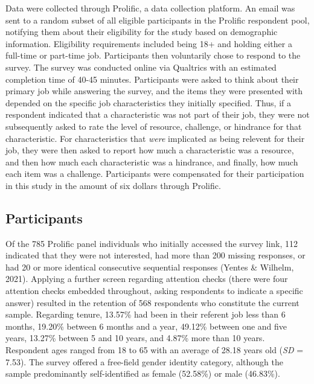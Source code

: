 \documentclass[
  man]{apa6}
\begin{document}
Data were collected through Prolific, a data collection platform. An email was sent to a random subset of all eligible participants in the Prolific respondent pool, notifying them about their eligibility for the study based on demographic information. Eligibility requirements included being 18+ and holding either a full-time or part-time job. Participants then voluntarily chose to respond to the survey. The survey was conducted online via Qualtrics with an estimated completion time of 40-45 minutes. Participants were asked to think about their primary job while answering the survey, and the items they were presented with depended on the specific job characteristics they initially specified. Thus, if a respondent indicated that a characteristic was not part of their job, they were not subsequently asked to rate the level of resource, challenge, or hindrance for that characteristic. For characteristics that \emph{were} implicated as being relevent for their job, they were then asked to report how much a characteristic was a resource, and then how much each characteristic was a hindrance, and finally, how much each item was a challenge. Participants were compensated for their participation in this study in the amount of six dollars through Prolific.

\hypertarget{participants}{%
\subsection{Participants}\label{participants}}

Of the 785 Prolific panel individuals who initially accessed the survey link, 112 indicated that they were not interested, had more than 200 missing responses, or had 20 or more identical consecutive sequential responses (Yentes \& Wilhelm, 2021). Applying a further screen regarding attention checks (there were four attention checks embedded throughout, asking respondents to indicate a specific answer) resulted in the retention of 568 respondents who constitute the current sample. Regarding tenure, 13.57\% had been in their referent job less than 6 months, 19.20\% between 6 months and a year, 49.12\% between one and five years, 13.27\% between 5 and 10 years, and 4.87\% more than 10 years. Respondent ages ranged from 18 to 65 with an average of 28.18 years old (\emph{SD} = 7.53). The survey offered a free-field gender identity category, although the sample predominantly self-identified as female (52.58\%) or male (46.83\%).
\end{document}

